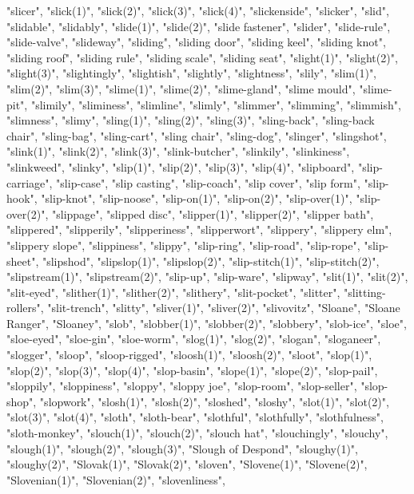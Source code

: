 "slicer",
"slick(1)",
"slick(2)",
"slick(3)",
"slick(4)",
"slickenside",
"slicker",
"slid",
"slidable",
"slidably",
"slide(1)",
"slide(2)",
"slide fastener",
"slider",
"slide-rule",
"slide-valve",
"slideway",
"sliding",
"sliding door",
"sliding keel",
"sliding knot",
"sliding roof",
"sliding rule",
"sliding scale",
"sliding seat",
"slight(1)",
"slight(2)",
"slight(3)",
"slightingly",
"slightish",
"slightly",
"slightness",
"slily",
"slim(1)",
"slim(2)",
"slim(3)",
"slime(1)",
"slime(2)",
"slime-gland",
"slime mould",
"slime-pit",
"slimily",
"sliminess",
"slimline",
"slimly",
"slimmer",
"slimming",
"slimmish",
"slimness",
"slimy",
"sling(1)",
"sling(2)",
"sling(3)",
"sling-back",
"sling-back chair",
"sling-bag",
"sling-cart",
"sling chair",
"sling-dog",
"slinger",
"slingshot",
"slink(1)",
"slink(2)",
"slink(3)",
"slink-butcher",
"slinkily",
"slinkiness",
"slinkweed",
"slinky",
"slip(1)",
"slip(2)",
"slip(3)",
"slip(4)",
"slipboard",
"slip-carriage",
"slip-case",
"slip casting",
"slip-coach",
"slip cover",
"slip form",
"slip-hook",
"slip-knot",
"slip-noose",
"slip-on(1)",
"slip-on(2)",
"slip-over(1)",
"slip-over(2)",
"slippage",
"slipped disc",
"slipper(1)",
"slipper(2)",
"slipper bath",
"slippered",
"slipperily",
"slipperiness",
"slipperwort",
"slippery",
"slippery elm",
"slippery slope",
"slippiness",
"slippy",
"slip-ring",
"slip-road",
"slip-rope",
"slip-sheet",
"slipshod",
"slipslop(1)",
"slipslop(2)",
"slip-stitch(1)",
"slip-stitch(2)",
"slipstream(1)",
"slipstream(2)",
"slip-up",
"slip-ware",
"slipway",
"slit(1)",
"slit(2)",
"slit-eyed",
"slither(1)",
"slither(2)",
"slithery",
"slit-pocket",
"slitter",
"slitting-rollers",
"slit-trench",
"slitty",
"sliver(1)",
"sliver(2)",
"slivovitz",
"Sloane",
"Sloane Ranger",
"Sloaney",
"slob",
"slobber(1)",
"slobber(2)",
"slobbery",
"slob-ice",
"sloe",
"sloe-eyed",
"sloe-gin",
"sloe-worm",
"slog(1)",
"slog(2)",
"slogan",
"sloganeer",
"slogger",
"sloop",
"sloop-rigged",
"sloosh(1)",
"sloosh(2)",
"sloot",
"slop(1)",
"slop(2)",
"slop(3)",
"slop(4)",
"slop-basin",
"slope(1)",
"slope(2)",
"slop-pail",
"sloppily",
"sloppiness",
"sloppy",
"sloppy joe",
"slop-room",
"slop-seller",
"slop-shop",
"slopwork",
"slosh(1)",
"slosh(2)",
"sloshed",
"sloshy",
"slot(1)",
"slot(2)",
"slot(3)",
"slot(4)",
"sloth",
"sloth-bear",
"slothful",
"slothfully",
"slothfulness",
"sloth-monkey",
"slouch(1)",
"slouch(2)",
"slouch hat",
"slouchingly",
"slouchy",
"slough(1)",
"slough(2)",
"slough(3)",
"Slough of Despond",
"sloughy(1)",
"sloughy(2)",
"Slovak(1)",
"Slovak(2)",
"sloven",
"Slovene(1)",
"Slovene(2)",
"Slovenian(1)",
"Slovenian(2)",
"slovenliness",
